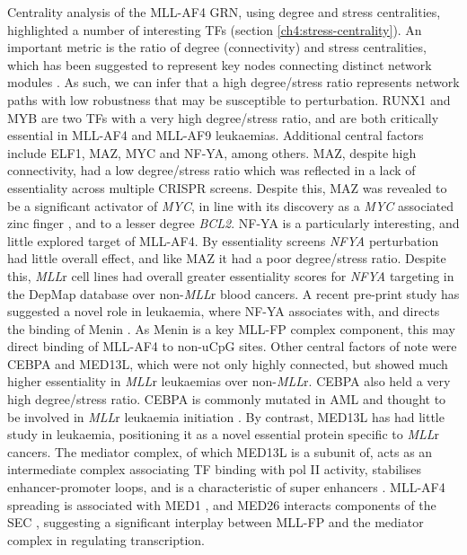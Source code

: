 Centrality analysis of the MLL-AF4 GRN, using degree and stress centralities, highlighted a number of interesting TFs (section \ref{ch4:stress-centrality}). An important metric is the ratio of degree (connectivity) and stress centralities, which has been suggested to represent key nodes connecting distinct network modules \citep{joy_high-betweenness_2005, koschutzki_centrality_2008}. As such, we can infer that a high degree/stress ratio represents network paths with low robustness that may be susceptible to perturbation. RUNX1 and MYB are two TFs with a very high degree/stress ratio, and are both critically essential in MLL-AF4 and MLL-AF9 leukaemias. Additional central factors include ELF1, MAZ, MYC and NF-YA, among others. MAZ, despite high connectivity, had a low degree/stress ratio which was reflected in a lack of essentiality across multiple CRISPR screens. Despite this, MAZ was revealed to be a significant activator of \textit{MYC}, in line with its discovery as a \textit{MYC} associated zinc finger \citep{komatsu_maz_1997}, and to a lesser degree \textit{BCL2}. NF-YA is a particularly interesting, and little explored target of MLL-AF4. By essentiality screens \textit{NFYA} perturbation had little overall effect, and like MAZ it had a poor degree/stress ratio. Despite this, \textit{MLL}r cell lines had overall greater essentiality scores for \textit{NFYA} targeting in the DepMap database over non-\textit{MLL}r blood cancers. A recent pre-print study has suggested a novel role in leukaemia, where NF-YA associates with, and directs the binding of Menin \citep{soto-feliciano_molecular_2022}. As Menin is a key MLL-FP complex component, this may direct binding of MLL-AF4 to non-uCpG sites. Other central factors of note were CEBPA and MED13L, which were not only highly connected, but showed much higher essentiality in \textit{MLL}r leukaemias over non-\textit{MLL}r. CEBPA also held a very high degree/stress ratio. CEBPA is commonly mutated in AML and thought to be involved in \textit{MLL}r leukaemia initiation \citep{roe_cebp_2014}. By contrast, MED13L has had little study in leukaemia, positioning it as a novel essential protein specific to \textit{MLL}r cancers. The mediator complex, of which MED13L is a subunit of, acts as an intermediate complex associating TF binding with pol II activity, stabilises enhancer-promoter loops, and is a characteristic of super enhancers \citep{allen_mediator_2015, whyte_master_2013}. MLL-AF4 spreading is associated with MED1 \citep{kerry_mll-af4_2017}, and MED26 interacts components of the SEC \citep{takahashi_human_2011}, suggesting a significant interplay between MLL-FP and the mediator complex in regulating transcription.

